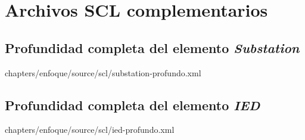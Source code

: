\chapter{Archivos SCL complementarios}
\label{app:codigos-SCL}


\section{Profundidad completa del 
elemento \emph{Substation}}


{chapters/enfoque/source/scl/substation-profundo.xml} 



\section{Profundidad completa del 
elemento \emph{IED}}
\label{app:SEC-profundidad-completa-IED}


{chapters/enfoque/source/scl/ied-profundo.xml} 
